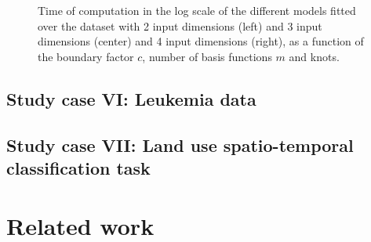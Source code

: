 \documentclass[]{interact}
\theoremstyle{plain}%
\theoremstyle{definition}
\theoremstyle{remark}
\begin{document}
\begin{figure}
\caption{Time of computation in the log scale of the different models fitted over the dataset with 2 input dimensions (left) and 3 input dimensions (center) and 4 input dimensions (right), as a function of the boundary factor $c$, number of basis functions $m$ and knots.}
  \label{fig20_time2D_diabetes}
\end{figure}




\subsection{Study case VI: Leukemia data}\label{sec:bf_caseVI}
\subsection{Study case VII: Land use spatio-temporal classification task}\label{sec:bf_caseVII}

\vspace{3mm}
\appendix

\section{Related work}
\end{document}
